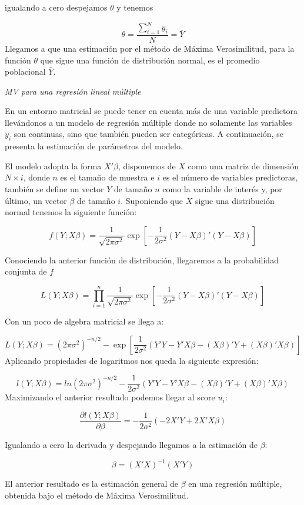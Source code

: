 \documentclass[
  12pt,
]{book}
\begin{document}
igualando a cero despejamos \(\theta\) y tenemos

\[
\theta=\dfrac{\sum_{i=1}^{N}y_{i}}{N}=\bar{Y}
\]
Llegamos a que una estimación por el método de Máxima Verosimilitud, para la función \(\theta\) que sigue una función de distribución normal, es el promedio poblacional \(\bar{Y}\).

\emph{MV para una regresión lineal múltiple}

En un entorno matricial se puede tener en cuenta más de una variable predictora llevándonos a un modelo de regresión múltiple donde no solamente las variables \(y_{i}\) son continuas, sino que también pueden ser categóricas. A continuación, se presenta la estimación de parámetros del modelo.

El modelo adopta la forma \(X'\beta\), disponemos de \(X\) como una matriz de dimensión \(N\times i\), donde \(n\) es el tamaño de muestra e \(i\) es el número de variables predictoras, también se define un vector \(Y\) de tamaño \(n\) como la variable de interés y, por último, un vector \(\beta\) de tamaño \(i\). Suponiendo que \(X\) sigue una distribución
normal tenemos la siguiente función:

\[
f(Y;X\beta)=\dfrac{1}{\sqrt{2\pi\sigma^{2}}}\exp\left[-\dfrac{1}{2\sigma^{2}}(Y-X\beta)'(Y-X\beta)\right]
\]

Conociendo la anterior función de distribución, llegaremos a la probabilidad conjunta de \(f\)

\[
L(Y;X\beta)=\prod_{i=1}^{n}\dfrac{1}{\sqrt{2\pi\sigma^{2}}}\exp\left[-\dfrac{1}{2\sigma^{2}}(Y-X\beta)'(Y-X\beta)\right]
\]

Con un poco de algebra matricial se llega a:

\[
L(Y;X\beta)=(2\pi\sigma^{2})^{-n/2}-\exp\left[\dfrac{1}{2\sigma^{2}}(Y'Y-Y'X\beta-(X\beta)'Y+(X\beta)'X\beta)\right]
\]
Aplicando propiedades de logaritmos nos queda la siguiente expresión:

\[
l(Y;X\beta)=ln(2\pi\sigma^{2})^{-n/2}-\dfrac{1}{2\sigma^{2}}(Y'Y-Y'X\beta-(X\beta)'Y+(X\beta)'X\beta)
\]
Maximizando el anterior resultado podemos llegar al score \(u_{i}\):

\[
\dfrac{\partial l(Y;X\beta)}{\partial\beta}=-\dfrac{1}{2\sigma^{2}}(-2X'Y+2X'X\beta)
\]

Igualando a cero la derivada y despejando llegamos a la estimación de \(\beta\):

\[
\beta=(X'X)^{-1}(X'Y)
\]

El anterior resultado es la estimación general de \(\beta\) en una regresión múltiple, obtenida bajo el método de Máxima Verosimilitud.
\end{document}
